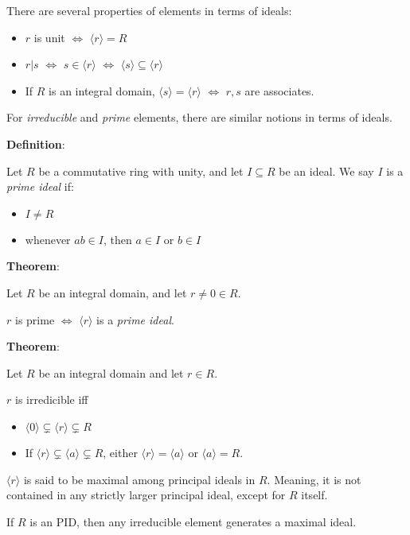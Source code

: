 \documentclass{article}
\begin{document}
\begin{multicols*}{2}
There are several properties of elements in terms of ideals:

\begin{itemize}
    \item $r$ is unit $\Leftrightarrow$ $\langle r \rangle = R$
    \item $r | s$ $\Leftrightarrow$ $s \in \langle r \rangle$ $\Leftrightarrow$ $\langle s \rangle \subseteq \langle r \rangle$
    \item If $R$ is an integral domain, $\langle s \rangle = \langle r \rangle$ $\Leftrightarrow$ $r, s$ are associates.
\end{itemize}

For \textit{irreducible} and \textit{prime} elements, there are similar notions in terms of ideals.

\textbf{Definition}:

Let $R$ be a commutative ring with unity, and let $I \subseteq R$ be an ideal. We say $I$ is a \textit{prime ideal} if: 

\begin{itemize}
    \item $I \neq R$
    \item whenever $ab \in I$, then $a \in I$ or $b \in I$
\end{itemize}

\textbf{Theorem}:

Let $R$ be an integral domain, and let $r \neq 0 \in R$.

$r$ is prime $\Leftrightarrow$ $\langle r \rangle$ is a \textit{prime ideal}.

\textbf{Theorem}:

Let $R$ be an integral domain and let $r \in R$.

$r$ is irredicible iff 

\begin{itemize}
    \item $\langle 0 \rangle \subsetneq \langle r \rangle \subsetneq R$
    \item If $\langle r \rangle \subsetneq \langle a \rangle \subsetneq R$, either $\langle r \rangle = \langle a \rangle$ or $\langle a \rangle = R$.
\end{itemize}

$\langle r \rangle$ is said to be maximal among principal ideals in $R$. Meaning, it is not contained in any strictly larger principal ideal, except for $R$ itself.

If $R$ is an PID, then any irreducible element generates a maximal ideal.



\end{multicols*}
\end{document}
